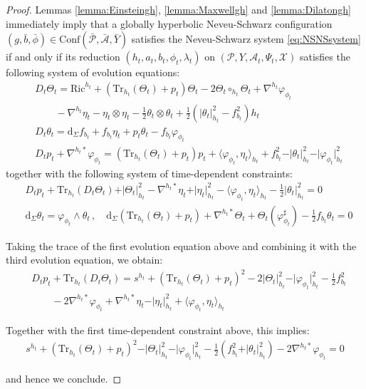 \documentclass[10pt,reqno,a4paper]{amsart}
\theoremstyle{plain}
\theoremstyle{definition}
\theoremstyle{remark}
\theoremstyle{remark}
\def\dd{\mathrm{d}}
\def\Conf{\mathrm{Conf}}
\newcommand{\Tr}{\mathrm{Tr}}
\def\cA{\mathcal{A}}
\def\cP{\mathcal{P}}
\def\cX{\mathcal{X}}
\newcommand{\Ric}{\mathrm{Ric}}
\renewcommand{\(}{ (}
\renewcommand{\)}{ )}
\begin{document}
\begin{proof}
Lemmas \ref{lemma:Einsteingh}, \ref{lemma:Maxwellgh} and \ref{lemma:Dilatongh} immediately imply that a globally hyperbolic Neveu-Schwarz configuration $(g,\bar{b},\bar{\phi})\in \Conf(\bar{\cP},\bar{\cA},\bar{Y})$ satisfies the Neveu-Schwarz system \eqref{eq:NSNSsystem} if and only if its reduction $( h_t , a_t , b_t , \phi_t,\lambda_t)$ on $(\cP,Y,\cA_t,\Psi_t,\cX)$ satisfies the following system of evolution equations:
\begin{eqnarray*}
& D_t \Theta_t = \Ric^{h_t} + (\Tr_{h_t}(\Theta_t) + p_t) \Theta_t - 2 \Theta_t\circ_{h_t} \Theta_t + \nabla^{h_t}\varphi_{\phi_t}\\
& \qquad -\nabla^{h_t}\eta_t-\eta_t\otimes\eta_t - \frac{1}{2} \theta_t \otimes \theta_t + \frac{1}{2} (\vert \theta_t\vert_{h_t}^2 - f_{b_t}^2) h_t \\
& D_t \theta_t = \dd_{\Sigma} f_{b_t}+f_{b_t}\eta_t+p_t\theta_t-f_{b_t}\varphi_{\phi_t} \\
& D_tp_t + \nabla^{h_t\ast}\varphi_{\phi_t} = (\Tr_{h_t}(\Theta_t) + p_t)p_t+\langle\varphi_{\phi_t},\eta_t\rangle_{h_t}+f_{b_t}^2-\vert\theta_t\vert_{h_t}^2-\vert\varphi_{\phi_t}\vert_{h_t}^2
\end{eqnarray*}
together with the following system of time-dependent constraints:
\begin{eqnarray*}
& D_tp_t+\Tr_{h_t}(D_t\Theta_t)+\vert\Theta_t\vert_{h_t}^2-\nabla^{h_t\ast}\eta_t+\vert\eta_t\vert_{h_t}^2-\langle\varphi_{\phi_t},\eta_t\rangle_{h_t}-\frac{1}{2}\vert\theta_t\vert_{h_t}^2 = 0\\
& \dd_{\Sigma}\theta_t=\varphi_{\phi_t}\wedge\theta_t \, , \quad \dd_{\Sigma}(\Tr_{h_t}(\Theta_t)+p_t)+\nabla^{h_t\ast}\Theta_t+\Theta_t(\varphi_{\phi_t}^{\sharp})-\frac{1}{2}f_{b_t}\theta_t=0
\end{eqnarray*}

\noindent
Taking the trace of the first evolution equation above and combining it with the third evolution equation, we obtain:
\begin{eqnarray*}
& D_tp_t+\Tr_{h_t}(D_t\Theta_t)=s^{h_t}+(\Tr_{h_t}(\Theta_t)+p_t)^2-2\vert\Theta_t\vert_{h_t}^2-\vert\varphi_{\phi_t}\vert_{h_t}^2-\frac{1}{2}f_{b_t}^2\\
& \qquad -2\nabla^{h_t\ast}\varphi_{\phi_t}+\nabla^{h_t\ast}\eta_t-\vert\eta_t\vert_{h_t}^2+\langle\varphi_{\phi_t},\eta_t\rangle_{h_t}
\end{eqnarray*}

\noindent
Together with the first time-dependent constraint above, this implies:
\begin{eqnarray*}
s^{h_t}+(\Tr_{h_t}(\Theta_t)+p_t)^2-\vert\Theta_t\vert_{h_t}^2-\vert\varphi_{\phi_t}\vert_{h_t}^2-\frac{1}{2}(f_{b_t}^2+\vert\theta_t\vert_{h_t}^2)-2\nabla^{h_t\ast}\varphi_{\phi_t}=0
\end{eqnarray*} 

\noindent
and hence we conclude. 
\end{proof}
\end{document}
